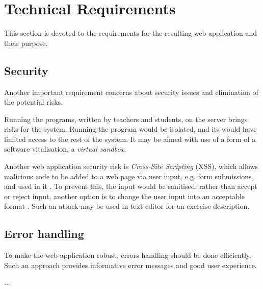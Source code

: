     \section{Technical Requirements}
    \label{sec:tech-requirements}
    This section is devoted to the requirements for the resulting web application and their purpose.
        
        \subsection{Security}
        \label{subsec:security}
        Another important requirement concerns about security issues and elimination of the potential risks.
        
        Running the programs, written by teachers and students, on the server brings risks for the system. Running the program would be isolated, and its would have limited access to the rest of the system. It may be aimed with use of a form of a software vitalisation, a \textit{virtual sandbox}.
        
        Another web application security risk is \textit{Cross-Site Scripting} (XSS), which allows malicious code to be added to a web page via user input, e.g. form submissions, and used in it \cite[A7-Cross-Site Scripting (XSS)]{owasp_xss}. To prevent this, the input would be sanitised: rather than accept or reject input, another option is to change the user input into an acceptable format \cite[Sanitize]{owasp_sanitize}. Such an attack may be used in text editor for an exercise description.
        
        \subsection{Error handling}
        To make the web application robust, errors handling should be done efficiently. Such an approach provides informative error messages and good user experience.
        
        ...

